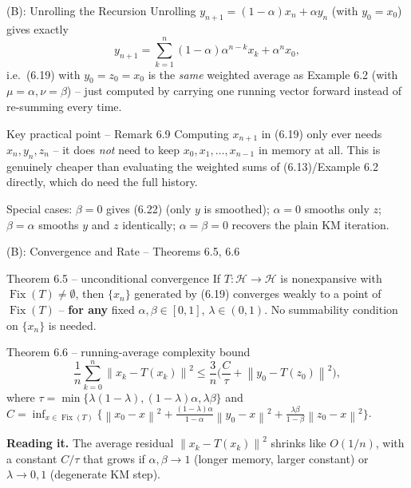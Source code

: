 \documentclass[aspectratio=169,10pt]{beamer}
\newcommand{\Hil}{\mathcal{H}}
\newcommand{\norm}[1]{\left\|#1\right\|}
\newcommand{\Fix}{\operatorname{Fix}}
\begin{document}
\begin{frame}{(B): Unrolling the Recursion}
Unrolling $y_{n+1}=(1-\alpha)x_n+\alpha y_n$ (with $y_0=x_0$) gives exactly
\[
y_{n+1}=\sum_{k=1}^n (1-\alpha)\alpha^{n-k}x_k + \alpha^n x_0,
\]
i.e.\ (6.19) with $y_0=z_0=x_0$ is the \emph{same} weighted average as
Example 6.2 (with $\mu=\alpha,\nu=\beta$) -- just computed by carrying one
running vector forward instead of re-summing every time.

\begin{block}{Key practical point -- Remark 6.9}
Computing $x_{n+1}$ in (6.19) only ever needs $x_n,y_n,z_n$ -- it does
\emph{not} need to keep $x_0,x_1,\dots,x_{n-1}$ in memory at all. This is
genuinely cheaper than evaluating the weighted sums of (6.13)/Example 6.2
directly, which do need the full history.
\end{block}
Special cases: $\beta=0$ gives (6.22) (only $y$ is smoothed); $\alpha=0$
smooths only $z$; $\beta=\alpha$ smooths $y$ and $z$ identically; $\alpha=
\beta=0$ recovers the plain KM iteration.
\end{frame}

\begin{frame}{(B): Convergence and Rate -- Theorems 6.5, 6.6}
\begin{block}{Theorem 6.5 -- unconditional convergence}
If $T:\Hil\to\Hil$ is nonexpansive with $\Fix(T)\ne\emptyset$, then
$\{x_n\}$ generated by (6.19) converges weakly to a point of $\Fix(T)$ --
\textbf{for any} fixed $\alpha,\beta\in[0,1]$, $\lambda\in(0,1)$. No
summability condition on $\{x_n\}$ is needed.
\end{block}
\begin{block}{Theorem 6.6 -- running-average complexity bound}
\[
\frac1n\sum_{k=0}^n \norm{x_k-T(x_k)}^2 \le \frac3n\Big(\frac{C}{\tau}+\norm{y_0-T(z_0)}^2\Big), \tag{6.23}
\]
where $\tau=\min\{\lambda(1-\lambda),(1-\lambda)\alpha,\lambda\beta\}$ and
$C=\inf_{x\in\Fix(T)}\{\norm{x_0-x}^2+\tfrac{(1-\lambda)\alpha}{1-\alpha}\norm{y_0-x}^2+\tfrac{\lambda\beta}{1-\beta}\norm{z_0-x}^2\}$.
\end{block}
\textbf{Reading it.} The average residual $\norm{x_k-T(x_k)}^2$ shrinks like
$O(1/n)$, with a constant $C/\tau$ that grows if $\alpha,\beta\to1$
(longer memory, larger constant) or $\lambda\to0,1$ (degenerate KM step).
\end{frame}
\end{document}
